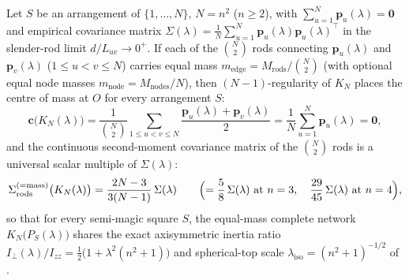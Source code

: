 \begin{theorem}
\label{thm:complete-network}
Let $S$ be an arrangement of $\{1,\dots,N\}$, $N=n^2$ ($n\ge2$), with $\sum_{u=1}^N\mathbf p_u(\lambda)=\mathbf 0$ and empirical covariance matrix $\Sigma(\lambda)=\frac1N\sum_{u=1}^N\mathbf p_u(\lambda)\mathbf p_u(\lambda)^{\top}$ in the slender-rod limit $d/L_{uv}\to 0^+$. If each of the $\binom{N}{2}$ rods connecting $\mathbf p_u(\lambda)$ and $\mathbf p_v(\lambda)$ ($1\le u<v\le N$) carries equal mass $m_{\mathrm{edge}}=M_{\mathrm{rods}}/\binom{N}{2}$ (with optional equal node masses $m_{\mathrm{node}}=M_{\mathrm{nodes}}/N$), then $(N-1)$-regularity of $K_N$ places the centre of mass at $O$ for every arrangement $S$:
\begin{equation}
\label{eq:kN-com}
\mathbf c\bigl(K_N(\lambda)\bigr) = \frac{1}{\binom{N}{2}}\sum_{1\le u<v\le N}\frac{\mathbf p_u(\lambda)+\mathbf p_v(\lambda)}{2} = \frac{1}{N}\sum_{u=1}^N\mathbf p_u(\lambda) = \mathbf 0,
\end{equation}
and the continuous second-moment covariance matrix of the $\binom{N}{2}$ rods is a universal scalar multiple of $\Sigma(\lambda)$:
\begin{equation}
\label{eq:kN-cov}
\Sigma_{\mathrm{rods}}^{(=\text{mass})}\bigl(K_N(\lambda)\bigr)
= \frac{2N-3}{3(N-1)}\,\Sigma(\lambda)
\qquad\Bigl(=\frac{5}{8}\,\Sigma(\lambda)\text{ at }n=3,\quad \frac{29}{45}\,\Sigma(\lambda)\text{ at }n=4\Bigr),
\end{equation}
so that for every semi-magic square $S$, the equal-mass complete network $K_N\bigl(P_S(\lambda)\bigr)$ shares the exact axisymmetric inertia ratio $I_\perp(\lambda)/I_{zz}=\frac12\bigl(1+\lambda^2(n^2+1)\bigr)$ and spherical-top scale $\lambda_{\mathrm{iso}}=(n^2+1)^{-1/2}$ of .


\end{theorem}
